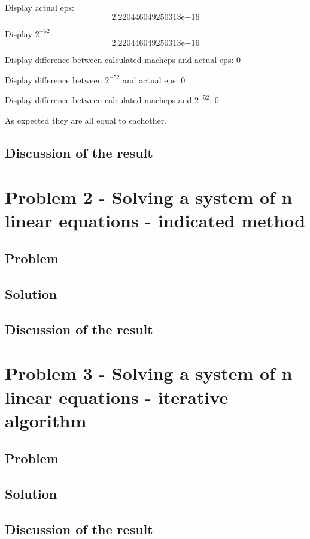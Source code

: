 \documentclass{report}
\begin{document}
Display actual eps:
     \[2.220446049250313\mathrm{e}{-16}\]

Display $2^{-52}$:
     \[2.220446049250313\mathrm{e}{-16}\]

Display difference between calculated macheps and actual eps:
     0

Display difference between $2^{-52}$ and actual eps:
     0

Display difference between calculated macheps and $2^{-52}$:
     0

As expected they are all equal to eachother.
\section{Discussion of the result}


\chapter{Problem 2 - Solving a system of n linear equations - indicated method}

\section{Problem}

\section{Solution}

\section{Discussion of the result}

\chapter{Problem 3 - Solving a system of n linear equations - iterative algorithm}

\section{Problem}

\section{Solution}

\section{Discussion of the result}
\end{document}
